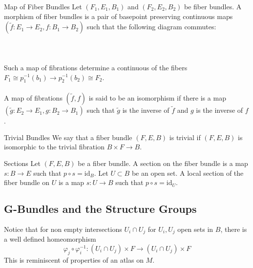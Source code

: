 \documentclass[a4paper]{article}
\begin{document}
\begin{defn}{Map of Fiber Bundles}{} Let $(F_1,E_1,B_1)$ and $(F_2,E_2,B_2)$ be fiber bundles. A morphism of fiber bundles is a pair of basepoint preserving continuous maps $(\tilde{f}:E_1\to E_2,f:B_1\to B_2)$ such that the following diagram commutes: \\~\\
\\~\\
Such a map of fibrations determine a continuous of the fibers $F_1\cong p_1^{-1}(b_1)\to p_2^{-1}(b_2)\cong F_2$. \\~\\

A map of fibrations $(\tilde{f},f)$ is said to be an isomorphism if there is a map $(\tilde{g}:E_2\to E_1,g:B_2\to B_1)$ such that $\tilde{g}$ is the inverse of $\tilde{f}$ and $g$ is the inverse of $f$. 
\end{defn}

\begin{defn}{Trivial Bundles}{} We say that a fiber bundle $(F,E,B)$ is trivial if $(F,E,B)$ is isomorphic to the trivial fibration $B\times F\to B$. 
\end{defn}

\begin{defn}{Sections}{} Let $(F,E,B)$ be a fiber bundle. A section on the fiber bundle is a map $s:B\to E$ such that $p\circ s=\text{id}_B$. Let $U\subset B$ be an open set. A local section of the fiber bundle on $U$ is a map $s:U\to B$ such that $p\circ s=\text{id}_U$. 
\end{defn}

\subsection{G-Bundles and the Structure Groups}
Notice that for non empty intersections $U_i\cap U_j$ for $U_i,U_j$ open sets in $B$, there is a well defined homeomorphism $$\varphi_j\circ\varphi_i^{-1}:(U_i\cap U_j)\times F\to(U_i\cap U_j)\times F$$ This is reminiscent of properties of an atlas on $M$. 
\end{document}
